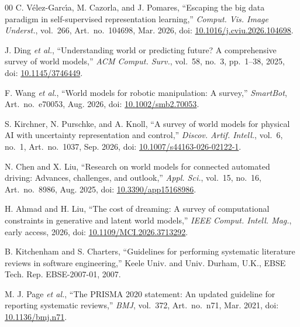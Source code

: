 \documentclass[conference,a4paper]{IEEEtran}
\begin{document}
\begin{thebibliography}{00}
C. V{\'e}lez-Garc{\'\i}a, M. Cazorla, and J. Pomares, ``Escaping the big data paradigm in self-supervised representation learning,'' \emph{Comput. Vis. Image Underst.}, vol.~266, Art.~no.~104698, Mar. 2026, doi: \url{10.1016/j.cviu.2026.104698}.

J. Ding \emph{et al.}, ``Understanding world or predicting future? A comprehensive survey of world models,'' \emph{ACM Comput. Surv.}, vol.~58, no.~3, pp.~1--38, 2025, doi: \url{10.1145/3746449}.

F. Wang \emph{et al.}, ``World models for robotic manipulation: A survey,'' \emph{SmartBot}, Art.~no.~e70053, Aug. 2026, doi: \url{10.1002/smb2.70053}.

S. Kirchner, N. Purschke, and A. Knoll, ``A survey of world models for physical AI with uncertainty representation and control,'' \emph{Discov. Artif. Intell.}, vol.~6, no.~1, Art.~no.~1037, Sep. 2026, doi: \url{10.1007/s44163-026-02122-1}.

N. Chen and X. Liu, ``Research on world models for connected automated driving: Advances, challenges, and outlook,'' \emph{Appl. Sci.}, vol.~15, no.~16, Art.~no.~8986, Aug. 2025, doi: \url{10.3390/app15168986}.

H. Ahmad and H. Liu, ``The cost of dreaming: A survey of computational constraints in generative and latent world models,'' \emph{IEEE Comput. Intell. Mag.}, early access, 2026, doi: \url{10.1109/MCI.2026.3713292}.

B. Kitchenham and S. Charters, ``Guidelines for performing systematic literature reviews in software engineering,'' Keele Univ. and Univ. Durham, U.K., EBSE Tech. Rep. EBSE-2007-01, 2007.

M. J. Page \emph{et al.}, ``The PRISMA 2020 statement: An updated guideline for reporting systematic reviews,'' \emph{BMJ}, vol.~372, Art.~no.~n71, Mar. 2021, doi: \url{10.1136/bmj.n71}.
\end{thebibliography}
\end{document}
